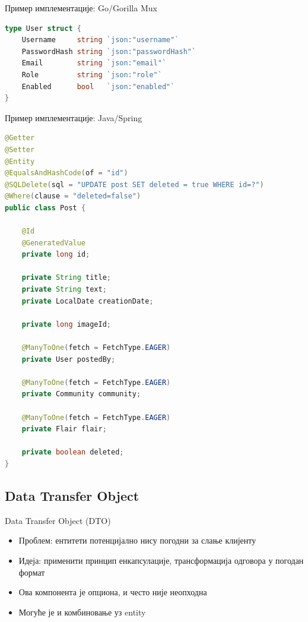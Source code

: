 \documentclass{beamer}
\begin{document}
    \begin{frame}[fragile]{Пример имплементације: Go/Gorilla Mux}
        \begin{adjustbox}{width=\textwidth,height=\textheight,keepaspectratio}
            \begin{lstlisting}[language=go]
type User struct {
    Username     string `json:"username"`
    PasswordHash string `json:"passwordHash"`
    Email        string `json:"email"`
    Role         string `json:"role"`
    Enabled      bool   `json:"enabled"`
}
            \end{lstlisting}
        \end{adjustbox}
    \end{frame}
    
    \begin{frame}[fragile]{Пример имплементације: Java/Spring}
        \begin{adjustbox}{width=0.65\textwidth,height=\textheight,keepaspectratio}
            \begin{lstlisting}[language=java]
@Getter
@Setter
@Entity
@EqualsAndHashCode(of = "id")
@SQLDelete(sql = "UPDATE post SET deleted = true WHERE id=?")
@Where(clause = "deleted=false")
public class Post {

    @Id
    @GeneratedValue
    private long id;

    private String title;
    private String text;
    private LocalDate creationDate;

    private long imageId;

    @ManyToOne(fetch = FetchType.EAGER)
    private User postedBy;

    @ManyToOne(fetch = FetchType.EAGER)
    private Community community;

    @ManyToOne(fetch = FetchType.EAGER)
    private Flair flair;

    private boolean deleted;
}
            \end{lstlisting}
        \end{adjustbox}
    \end{frame}
    
    \subsection{Data Transfer Object}
    
    \begin{frame}{Data Transfer Object (DTO)}
        \begin{itemize}
            \item Проблем: ентитети потенцијално нису погодни за слање клијенту
            \item Идеја: применити принцип енкапсулације, трансформација одговора у погодан формат
            \item Ова компонента је опциона, и често није неопходна
            \item Могуће је и комбиновање уз entity
        \end{itemize}
    \end{frame}
    
\end{document}
